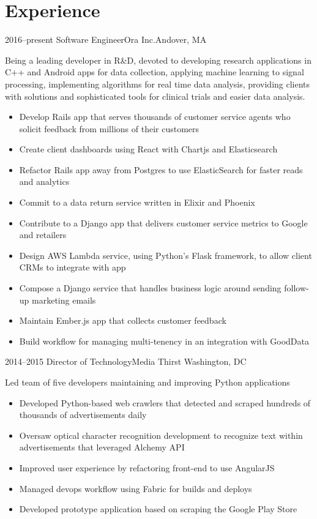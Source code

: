 \documentclass[10pt,a4paper,merriweather]{moderncv}        %
\begin{document}
\makecvtitle
\vspace{-1.5cm}

\section{Experience}

\cventry
{2016--present}
{Software Engineer}{Ora Inc.}{Andover, MA}{}
{Being a leading developer in R\&D, devoted to developing research applications in C++ and Android apps for data collection, applying machine learning to signal processing, implementing algorithms for real time data analysis, providing clients with solutions and sophisticated tools for clinical trials and easier data analysis.
\begin{itemize}
\item Develop Rails app that serves thousands of customer service agents who solicit feedback from millions of their customers
\item Create client dashboards using React with Chartjs and Elasticsearch
\item Refactor Rails app away from Postgres to use ElasticSearch for faster reads and analytics
\item Commit to a data return service written in Elixir and Phoenix
\item Contribute to a Django app that delivers customer service metrics to Google and retailers
\item Design AWS Lambda service, using Python's Flask framework, to allow client CRMs to integrate with app
\item Compose a Django service that handles business logic around sending follow-up marketing emails
\item Maintain Ember.js app that collects customer feedback
\item Build workflow for managing multi-tenency in an integration with GoodData
\end{itemize}}

\cventry
{2014--2015}
{Director of Technology}{Media Thirst }{Washington, DC}{}
{Led team of five developers maintaining and improving Python applications
\begin{itemize}
\item Developed Python-based web crawlers that detected and scraped hundreds of thousands of advertisements daily
\item Oversaw optical character recognition development to recognize text within advertisements that leveraged Alchemy API
\item Improved user experience by refactoring front-end to use AngularJS
\item Managed devops workflow using Fabric for builds and deploys
\item Developed prototype application based on scraping the Google Play Store
\end{itemize}}
\vspace{.15cm}
\end{document}
